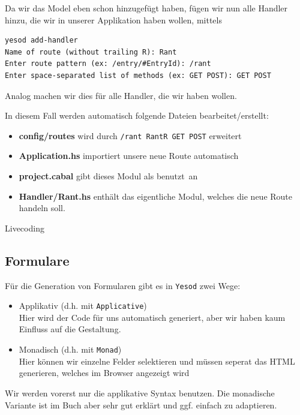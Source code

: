 \documentclass{beamer}
\begin{document}
\begin{frame}[fragile]
Da wir das Model eben schon hinzugefügt haben, fügen wir nun alle Handler hinzu, die wir in unserer Applikation haben wollen, mittels
\footnotesize
\begin{verbatim}
yesod add-handler
Name of route (without trailing R): Rant
Enter route pattern (ex: /entry/#EntryId): /rant
Enter space-separated list of methods (ex: GET POST): GET POST
\end{verbatim}
\normalsize
\pause
Analog machen wir dies für alle Handler, die wir haben wollen.\\\par\pause
In diesem Fall werden automatisch folgende Dateien bearbeitet/erstellt:
\begin{itemize}
 \item \textbf{config/routes} wird durch \texttt{/rant RantR GET POST} erweitert
 \pause
 \item \textbf{Application.hs} importiert unsere neue Route automatisch
 \pause
 \item \textbf{project.cabal} gibt dieses Modul als \glqq benutzt\grqq \ an
 \pause
 \item \textbf{Handler/Rant.hs} enthält das eigentliche Modul, welches die neue Route handeln soll.
\end{itemize}

\end{frame}

\begin{frame}
Livecoding
\end{frame}

\subsection{Formulare}

\begin{frame}[fragile]
Für die Generation von Formularen gibt es in \texttt{Yesod} zwei Wege:\pause
\begin{itemize}
 \item Applikativ (d.h. mit \texttt{Applicative})\pause\\
       Hier wird der Code für uns automatisch generiert, aber wir haben kaum Einfluss auf die Gestaltung.
 \pause
 \item Monadisch (d.h. mit \texttt{Monad})\pause\\
       Hier können wir einzelne Felder selektieren und müssen seperat das HTML generieren, welches im Browser angezeigt wird
\end{itemize}
\pause
Wir werden vorerst nur die applikative Syntax benutzen. Die monadische Variante ist im Buch aber sehr gut erklärt und ggf. einfach zu adaptieren.
\end{frame}
\end{document}
